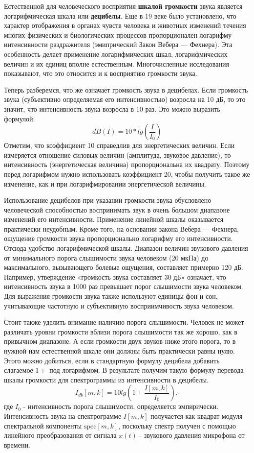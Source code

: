 Естественной для человеческого восприятия \textbf{шкалой громкости} звука является логарифмическая шкала или \textbf{децибелы}.
Еще в 19 веке было установлено, что характер отображения в органах чувств человека и животных изменений течения многих физических и 
биологических процессов пропорционален логарифму интенсивности раздражителя (эмипрический Закон Вебера — Фехнера).
Эта особенность делает применение логарифмических шкал, логарифмических величин и их единиц вполне естественным.
Многочисленные исследования показывают, что это относится и к восприятию громкости звука.

Теперь разберемся, что же означает громкость звука в децибелах. 
Если громкость звука (субъективно определяемая его интенсивностью) возросла на 10 дБ, то это значит, что интенсивность звука возросла в 10 раз.
Это можно выразить формулой:
\begin{equation}
  dB(I) = 10 * lg(\frac{I}{I_0})
\end{equation}
Отметим, что коэффициент 10 справедлив для энергетических величин. 
Если измеряется отношение силовых величин (амплитуда, звуковое давление), то интенсивность (энергетическая величина) пропорциональна их квадрату. 
Поэтому перед логарифмом нужно использовать коэффициент 20, чтобы получить такое же изменение, как и при логарифмировании энергетической величины.

Использование децибелов при указании громкости звука обусловлено человеческой способностью воспринимать звук в очень большом диапазоне изменений его интенсивности. 
Применение линейной шкалы оказывается практически неудобным. Кроме того, на основании закона Вебера — Фехнера, 
ощущение громкости звука пропорционально логарифму его интенсивности. Отсюда удобство логарифмической шкалы. 
Диапазон величин звукового давления от минимального порога слышимости звука человеком (20 мкПа) до максимального, 
вызывающего болевые ощущения, составляет примерно 120 дБ. 
Например, утверждение «громкость звука составляет 30 дБ» означает, что интенсивность звука в 1000 раз превышает порог слышимости звука человеком.
Для выражения громкости звука также используют единицы фон и сон, учитывающие частотную и субъективную восприимчивость звука человеком.

Стоит также уделить внимание наличию порога слышимости. Человек не может различать уровни громкости вблизи порога слышимости так же хорошо, 
как в привычном диапазоне. А если громкости двух звуков ниже этого порога, то в нужной нам естественной шкале они должны быть практически равны нулю.
Этого можно добиться, если в стандартную формулу децибела добавить слагаемое $1 +$ под логарифмом. 
В результате получим такую формулу перевода шкалы громкости для спектрограммы из интенсивности в децибелы.
\begin{equation}
  I_{db}[m, k] = 10 lg(1 + \frac{I[m, k]}{I_0}),
\end{equation}
где $I_0$ - интенсивность порога слышимости, определяется эмпирически. Интенсивность звука на спектрограмме $I[m,k]$ получается как 
квадрат модуля спектральной компоненты $\mathrm{spec}[m,k]$, поскольку спектр получен с помощью линейного преобразования от сигнала 
$x(t)$ - звукового давления микрофона от времени.


